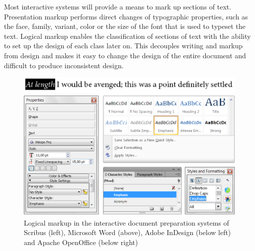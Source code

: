 \documentclass{book}
\begin{document}
        Most interactive systems will provide a means to mark up sections of
        text. Presentation markup performs direct changes of typographic
        properties, such as the face, family, variant, color or the size
        of the font that is used to typeset the text. Logical markup enables
        the classification of sections of text with the ability to set up the
        design of each class later on. This decouples writing and markup from
        design and makes it easy to change the design of the entire document and
        difficult to produce inconsistent design.

        \begin{figure}
          \includegraphics[width=\textwidth]{examples/02/interactive-editors.png}
          \caption{Logical markup in the interactive document preparation
            systems of Scribus (left), Microsoft Word (above), Adobe InDesign
            (below left) and Apache OpenOffice (below right)}
        \end{figure}

\end{document}
